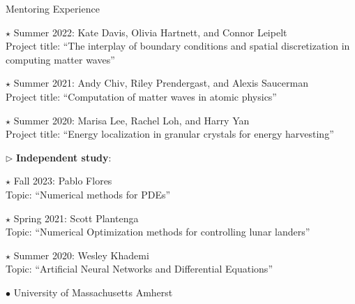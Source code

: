\documentclass[10pt]{article} %
\newenvironment{outerlist}[1][\enskip\textbullet]%
        {\begin{itemize}[#1]}{\end{itemize}%
         \vspace{-.6\baselineskip}}
\newenvironment{innerlist}[1][\enskip\textbullet]%
        {\begin{compactitem}[#1]}{\end{compactitem}}
\begin{document}
\begin{section}{Mentoring Experience}
\begin{outerlist}
\begin{innerlist}
\begin{innerlist}
\item[$\star$] Summer 2022: Kate Davis, Olivia Hartnett, and Connor Leipelt\\
Project title: ``The interplay of boundary conditions and spatial discretization in computing matter waves''
\item[$\star$] Summer 2021: Andy Chiv, Riley Prendergast, and Alexis Saucerman\\
Project title: ``Computation of matter waves in atomic physics''
\item[$\star$] Summer 2020: Marisa Lee, Rachel Loh, and Harry Yan \\
Project title: ``Energy localization in granular crystals for energy harvesting''
\end{innerlist}
\item[$\triangleright$] \textbf{Independent study}:
\begin{innerlist}
\item[$\star$] Fall 2023: Pablo Flores \\
Topic: ``Numerical methods for PDEs''
\item[$\star$] Spring 2021: Scott Plantenga \\
Topic: ``Numerical Optimization methods for controlling lunar landers''
\item[$\star$] Summer 2020: Wesley Khademi \\
Topic: ``Artificial Neural Networks and Differential Equations''
\end{innerlist}
\end{innerlist}


\item[$\bullet$] University of Massachusetts Amherst

\begin{innerlist}


\end{innerlist}
\end{outerlist}
\end{section}
\end{document}
